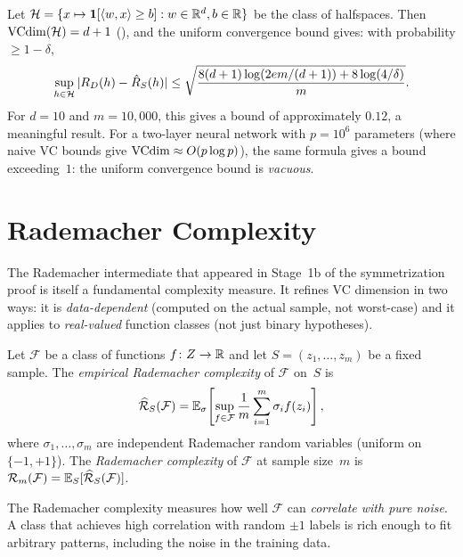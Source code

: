 \begin{example}[Halfspaces in $\R^d$]
\label{ex:halfspace-uc}
Let $\mathcal{H} = \{x \mapsto \mathbf{1}[\langle w, x \rangle \geq b]
: w \in \mathbb{R}^d, b \in \mathbb{R}\}$ be the class of halfspaces.
Then $\mathrm{VCdim}(\mathcal{H}) = d+1$ (), and the uniform
convergence bound gives: with probability $\geq 1 - \delta$,
\[
  \sup_{h \in \mathcal{H}} |R_D(h) - \hat{R}_S(h)|
  \leq \sqrt{\frac{8(d+1)\log(2em/(d+1)) + 8\log(4/\delta)}{m}}.
\]
For $d = 10$ and $m = 10{,}000$, this gives a bound of approximately
$0.12$, a meaningful result.  For a two-layer neural network
with $p = 10^6$ parameters (where naive VC bounds give
$\mathrm{VCdim} \approx O(p \log p)$), the same formula gives a bound exceeding~$1$:
the uniform convergence bound is \emph{vacuous}.
\end{example}



\section{Rademacher Complexity}
\label{sec:rademacher}

The Rademacher intermediate that appeared in Stage~1b of the
symmetrization proof is itself a fundamental complexity measure.  It
refines VC dimension in two ways: it is \emph{data-dependent} (computed on
the actual sample, not worst-case) and it applies to \emph{real-valued}
function classes (not just binary hypotheses).

\begin{defn}
\label{def:rademacher}
Let $\mathcal{F}$ be a class of functions $f \colon Z \to \mathbb{R}$ and let
$S = (z_1, \ldots, z_m)$ be a fixed sample.  The \emph{empirical
Rademacher complexity} of $\mathcal{F}$ on~$S$ is
\[
  \widehat{\mathcal{R}}_S(\mathcal{F}) = \mathbb{E}_{\sigma}\!\left[\sup_{f \in \mathcal{F}}
    \frac{1}{m}\sum_{i=1}^m \sigma_i f(z_i)\right],
\]
where $\sigma_1, \ldots, \sigma_m$ are independent Rademacher random
variables (uniform on $\{-1, +1\}$).  The \emph{Rademacher complexity} of
$\mathcal{F}$ at sample size~$m$ is
$\mathcal{R}_m(\mathcal{F}) = \mathbb{E}_S[\widehat{\mathcal{R}}_S(\mathcal{F})]$.
\end{defn}

The Rademacher complexity measures how well $\mathcal{F}$ can
\emph{correlate with pure noise}.  A class that achieves high correlation
with random $\pm 1$ labels is rich enough to fit arbitrary patterns,
including the noise in the training data.

